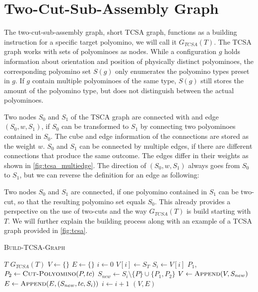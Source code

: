 \section{Two-Cut-Sub-Assembly Graph}
\label{sec:tcsa}

The two-cut-sub-assembly graph, short TCSA graph, functions as a building instruction for a specific target polyomino, we will call it $G_{TCSA}(T)$.
The TCSA graph works with sets of polyominoes as nodes.
While a configuration $g$ holds information about orientation and position of physically distinct polyominoes, the corresponding polyomino set $S(g)$ only enumerates the polyomino types preset in $g$.
If $g$ contain multiple polyominoes of the same type, $S(g)$ still stores the amount of the polyomino type, but does not distinguish between the actual polyominoes.

Two nodes $S_0$ and $S_1$ of the TSCA graph are connected with and edge $(S_0,w,S_1)$, if $S_0$ can be transformed to $S_1$ by connecting two polyominoes contained in $S_0$.
The cube and edge information of the connections are stored as the weight $w$.
$S_0$ and $S_1$ can be connected by multiple edges, if there are different connections that produce the same outcome.
The edges differ in their weights as shown in \autoref{fig:tcsa_multiedge}.
The direction of $(S_0,w,S_1)$ always goes from $S_0$ to $S_1$, but we can reverse the definition for an edge as following:

Two nodes $S_0$ and $S_1$ are connected, if one polyomino contained in $S_1$ can be two-cut, so that the resulting polyomino set equals $S_0$.
This already provides a perspective on the use of two-cuts and the way $G_{TCSA}(T)$ is build starting with $T$.
We will further explain the building process along with an example of a TCSA graph provided in \autoref{fig:tcsa}.


\begin{algorithm}
	\caption{\scshape Build-TCSA-Graph}
	\label{algo:build_tcsa}
	\begin{algorithmic}[1]
		\REQUIRE $T$
		\ENSURE $G_{TCSA}(T)$  
		\STATE $V \gets \{\}$
		\STATE $E \gets \{\}$
		\STATE $i \gets 0$
		\STATE $V[i] \gets S_T$	
			\STATE $S_i \gets V[i]$
					\STATE $P_1$,$P_2 \gets \text{\scshape Cut-Polyomino}(P, tc)$
					\STATE $S_{new} \gets S_i \setminus \{P\} \cup \{P_1, P_2\}$ 
						\STATE $V \gets \text{\scshape Append}(V, S_{new})$
					\ENDIF
					\STATE $E \gets \text{\scshape Append}(E, (S_{new}, tc, S_i))$
				\ENDFOR
			\ENDFOR
			\STATE $i \gets i+1$
		\ENDWHILE
		\RETURN $(V,E)$
	\end{algorithmic}
\end{algorithm}


